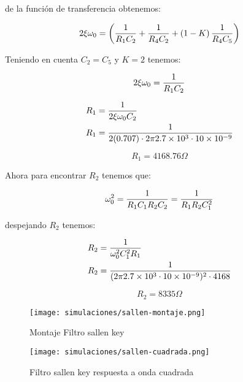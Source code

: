 de la función de transferencia obtenemos:

\begin{equation}
    2\xi \omega_0 = \left(\frac{1}{R_1 C_2} + \frac{1}{R_4 C_2} + \left(1 - K\right) \frac{1}{R_4 C_5}\right)
\end{equation}

Teniendo en cuenta $C_2 = C_5$ y $K=2$ tenemos:

\begin{equation}
    2\xi \omega_0 = \frac{1}{R_1 C_2}
\end{equation}

\begin{align*}
    R_1 &= \frac{1}{2\xi \omega_0 C_2} \\
    R_1 &= \frac{1}{2 (0.707) \cdot 2\pi 2.7\times 10^3 \cdot 10\times 10 ^{-9}}
\end{align*}

\begin{equation*}
    R_1 = 4168.76 \Omega
\end{equation*}

Ahora para encontrar $R_2$ tenemos que:

\begin{equation}
    \omega_0^2 = \frac{1}{R_1 C_1 R_2 C_2} = \frac{1}{R_1 R_2 C_1^2}
\end{equation}

despejando $R_2$ tenemos:

\begin{align*}
    R_2 &= \frac{1}{\omega_0^2 C_1^2 R_1} \\
    R_2 &= \frac{1}{(2\pi 2.7\times 10^3 \cdot 10\times 10^{-9})^2 \cdot 4168} \\
\end{align*}

\begin{equation*}
    \boxed{R_2 = 8335 \Omega}
\end{equation*}

\begin{figure}[ht]
    \centering
    \texttt{[image: simulaciones/sallen-montaje.png]}
    \caption{Montaje Filtro sallen key}\label{fig:sim-sallen-montaje} 
\end{figure}

\begin{figure}[ht]
    \centering
    \texttt{[image: simulaciones/sallen-cuadrada.png]}
    \caption{Filtro sallen key respuesta a onda cuadrada  }
    \label{fig:sim-sallen-cuadrada} 
\end{figure}

